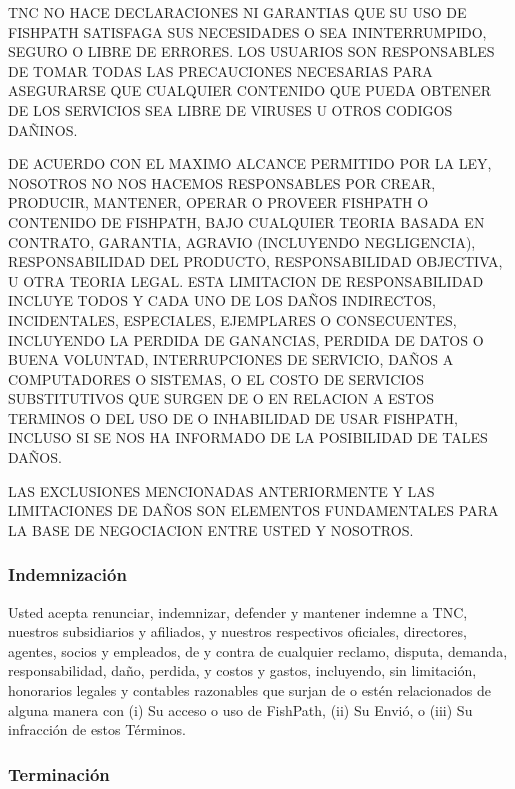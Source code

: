\documentclass[
  11pt,
]{book}
\begin{document}
TNC NO HACE DECLARACIONES NI GARANTIAS QUE SU USO DE FISHPATH SATISFAGA SUS NECESIDADES O SEA ININTERRUMPIDO, SEGURO O LIBRE DE ERRORES. LOS USUARIOS SON RESPONSABLES DE TOMAR TODAS LAS PRECAUCIONES NECESARIAS PARA ASEGURARSE QUE CUALQUIER CONTENIDO QUE PUEDA OBTENER DE LOS SERVICIOS SEA LIBRE DE VIRUSES U OTROS CODIGOS DAÑINOS.

DE ACUERDO CON EL MAXIMO ALCANCE PERMITIDO POR LA LEY, NOSOTROS NO NOS HACEMOS RESPONSABLES POR CREAR, PRODUCIR, MANTENER, OPERAR O PROVEER FISHPATH O CONTENIDO DE FISHPATH, BAJO CUALQUIER TEORIA BASADA EN CONTRATO, GARANTIA, AGRAVIO (INCLUYENDO NEGLIGENCIA), RESPONSABILIDAD DEL PRODUCTO, RESPONSABILIDAD OBJECTIVA, U OTRA TEORIA LEGAL. ESTA LIMITACION DE RESPONSABILIDAD INCLUYE TODOS Y CADA UNO DE LOS DAÑOS INDIRECTOS, INCIDENTALES, ESPECIALES, EJEMPLARES O CONSECUENTES, INCLUYENDO LA PERDIDA DE GANANCIAS, PERDIDA DE DATOS O BUENA VOLUNTAD, INTERRUPCIONES DE SERVICIO, DAÑOS A COMPUTADORES O SISTEMAS, O EL COSTO DE SERVICIOS SUBSTITUTIVOS QUE SURGEN DE O EN RELACION A ESTOS TERMINOS O DEL USO DE O INHABILIDAD DE USAR FISHPATH, INCLUSO SI SE NOS HA INFORMADO DE LA POSIBILIDAD DE TALES DAÑOS.

LAS EXCLUSIONES MENCIONADAS ANTERIORMENTE Y LAS LIMITACIONES DE DAÑOS SON ELEMENTOS FUNDAMENTALES PARA LA BASE DE NEGOCIACION ENTRE USTED Y NOSOTROS.

\hypertarget{indemnizaciuxf3n}{%
\subsubsection*{Indemnización}\label{indemnizaciuxf3n}}

Usted acepta renunciar, indemnizar, defender y mantener indemne a TNC, nuestros subsidiarios y afiliados, y nuestros respectivos oficiales, directores, agentes, socios y empleados, de y contra de cualquier reclamo, disputa, demanda, responsabilidad, daño, perdida, y costos y gastos, incluyendo, sin limitación, honorarios legales y contables razonables que surjan de o estén relacionados de alguna manera con (i) Su acceso o uso de FishPath, (ii) Su Envió, o (iii) Su infracción de estos Términos.

\hypertarget{terminaciuxf3n}{%
\subsubsection*{Terminación}\label{terminaciuxf3n}}
\end{document}
